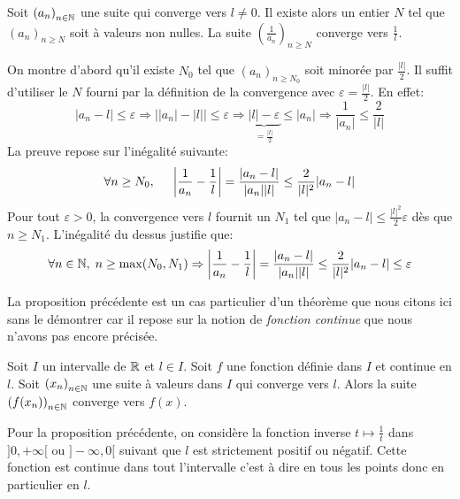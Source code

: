 \begin{propn}
Soit $\left( a_n\right) _{n\in \mathbb{N}}$ une suite qui converge vers $l\neq 0$. Il existe alors un entier $N$ tel que $\left( a_n\right) _{n\geq N}$ soit à valeurs non nulles. La suite $\left( \frac{1}{a_n}\right) _{n\geq N}$ converge vers $\frac{1}{l}$.  
\end{propn}
\begin{demo}
  On montre d'abord qu'il existe $N_0$ tel que $\left( a_n\right) _{n\geq N_0}$ soit minorée par $\frac{|l|}{2}$. Il suffit d'utiliser le $N$ fourni par la définition de la convergence avec $\varepsilon = \frac{|l|}{2}$. En effet:
\begin{displaymath}
  \left|a_n -l\right| \leq \varepsilon \Rightarrow \left||a_n|-|l|\right| \leq \varepsilon
  \Rightarrow \underset{=\frac{|l|}{2}}{\underbrace{|l|-\varepsilon}} \leq |a_n| \Rightarrow \frac{1}{|a_n|}\leq \frac{2}{|l|}
\end{displaymath}
La preuve repose sur l'inégalité suivante:
\begin{displaymath}
  \forall n \geq N_0,\hspace{0.5cm} \left| \frac{1}{a_n} - \frac{1}{l}\right| = \frac{|a_n -l|}{|a_n||l|} \leq \frac{2}{|l|^2}|a_n -l|
\end{displaymath}
Pour tout $\varepsilon >0$, la convergence vers $l$ fournit un $N_1$ tel que $|a_n - l|\leq \frac{|l|^2}{2}\varepsilon$ dès que $n\geq N_1$. L'inégalité du dessus justifie que:
\begin{displaymath}
\forall n\in \mathbb{N},\; n \geq \max(N_0, N_1)  
\Rightarrow 
\left| \frac{1}{a_n} - \frac{1}{l}\right| = \frac{|a_n -l|}{|a_n||l|} \leq \frac{2}{|l|^2}|a_n -l| \leq \varepsilon
\end{displaymath}
\end{demo}
La proposition précédente est un cas particulier d'un théorème que nous citons ici sans le démontrer car il repose sur la notion de \emph{fonction continue} que nous n'avons pas encore précisée.
\begin{thm}
  Soit $I$ un intervalle de $\mathbb{R}$ et $l\in I$. Soit $f$ une fonction définie dans $I$ et continue en $l$. Soit $\left( x_n\right)_{n\in \mathbb{N}}$ une suite à valeurs dans $I$ qui converge vers $l$. Alors la suite $\left( f(x_n)\right)_{n\in \mathbb{N}}$ converge vers $f(x)$.
\end{thm}
Pour la proposition précédente, on considère la fonction inverse $t\mapsto \frac{1}{t}$ dans $]0,+\infty[$ ou $]-\infty , 0[$ suivant que $l$ est strictement positif ou négatif. Cette fonction est continue dans tout l'intervalle c'est à dire en tous les points donc en particulier en $l$. 

